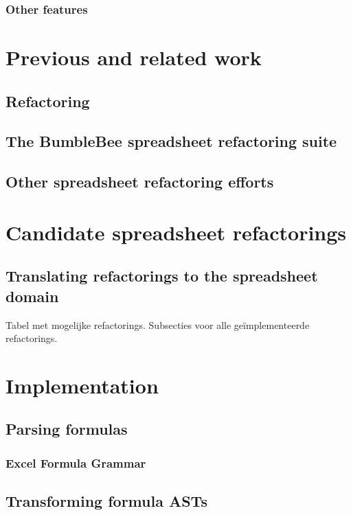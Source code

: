 \documentclass[12pt,a4paper,onecolumn,oneside]{memoir}
\begin{document}
\subsection{Other features}

\chapter{Previous and related work}

\section{Refactoring}

\section{The BumbleBee spreadsheet refactoring suite}

\section{Other spreadsheet refactoring efforts}


\chapter{Candidate spreadsheet refactorings}

\section{Translating refactorings to the spreadsheet domain}

Tabel met mogelijke refactorings.
Subsecties voor alle geïmplementeerde refactorings.

\chapter{Implementation}

\section{Parsing formulas}

\subsection{Excel Formula Grammar}

\section{Transforming formula ASTs}
\end{document}
